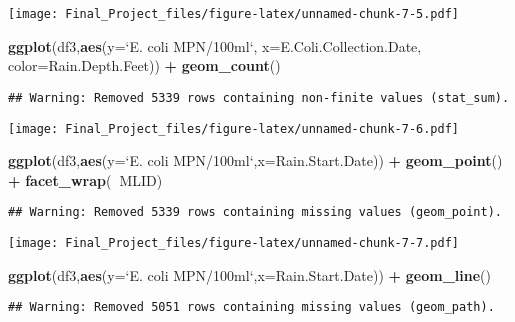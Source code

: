 \documentclass[
]{article}
\newenvironment{Shaded}{\begin{snugshade}}{\end{snugshade}}
\newcommand{\DataTypeTok}[1]{\textcolor[rgb]{0.13,0.29,0.53}{#1}}
\newcommand{\KeywordTok}[1]{\textcolor[rgb]{0.13,0.29,0.53}{\textbf{#1}}}
\newcommand{\NormalTok}[1]{#1}
\newcommand{\OperatorTok}[1]{\textcolor[rgb]{0.81,0.36,0.00}{\textbf{#1}}}
\newcommand{\StringTok}[1]{\textcolor[rgb]{0.31,0.60,0.02}{#1}}
\begin{document}
\texttt{[image: Final\_Project\_files/figure-latex/unnamed-chunk-7-5.pdf]}

\begin{Shaded}
\begin{Highlighting}[]
\KeywordTok{ggplot}\NormalTok{(df3,}\KeywordTok{aes}\NormalTok{(}\DataTypeTok{y=}\StringTok{`}\DataTypeTok{E. coli MPN/100ml}\StringTok{`}\NormalTok{, }\DataTypeTok{x=}\NormalTok{E.Coli.Collection.Date, }\DataTypeTok{color=}\NormalTok{Rain.Depth.Feet)) }\OperatorTok{+}\StringTok{ }\KeywordTok{geom_count}\NormalTok{()}
\end{Highlighting}
\end{Shaded}

\begin{verbatim}
## Warning: Removed 5339 rows containing non-finite values (stat_sum).
\end{verbatim}

\texttt{[image: Final\_Project\_files/figure-latex/unnamed-chunk-7-6.pdf]}

\begin{Shaded}
\begin{Highlighting}[]
\KeywordTok{ggplot}\NormalTok{(df3,}\KeywordTok{aes}\NormalTok{(}\DataTypeTok{y=}\StringTok{`}\DataTypeTok{E. coli MPN/100ml}\StringTok{`}\NormalTok{,}\DataTypeTok{x=}\NormalTok{Rain.Start.Date)) }\OperatorTok{+}\StringTok{ }
\StringTok{  }\KeywordTok{geom_point}\NormalTok{() }\OperatorTok{+}\StringTok{ }\KeywordTok{facet_wrap}\NormalTok{(}\OperatorTok{~}\NormalTok{MLID)}
\end{Highlighting}
\end{Shaded}

\begin{verbatim}
## Warning: Removed 5339 rows containing missing values (geom_point).
\end{verbatim}

\texttt{[image: Final\_Project\_files/figure-latex/unnamed-chunk-7-7.pdf]}

\begin{Shaded}
\begin{Highlighting}[]
\KeywordTok{ggplot}\NormalTok{(df3,}\KeywordTok{aes}\NormalTok{(}\DataTypeTok{y=}\StringTok{`}\DataTypeTok{E. coli MPN/100ml}\StringTok{`}\NormalTok{,}\DataTypeTok{x=}\NormalTok{Rain.Start.Date)) }\OperatorTok{+}\StringTok{ }
\StringTok{  }\KeywordTok{geom_line}\NormalTok{() }
\end{Highlighting}
\end{Shaded}

\begin{verbatim}
## Warning: Removed 5051 rows containing missing values (geom_path).
\end{verbatim}
\end{document}
